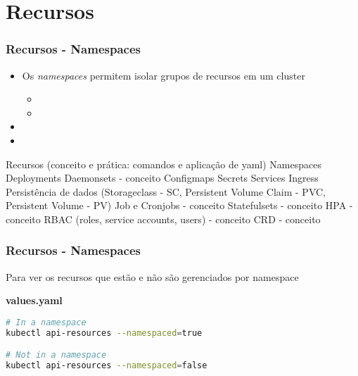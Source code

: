 \section{Recursos}

\begin{frame}
\frametitle{Recursos - Namespaces}

\begin{itemize}
	\item Os \textit{namespaces} permitem isolar grupos de recursos em um cluster
		\begin{itemize}
			\item {}
			\item {}
		\end{itemize}
	\item {}
	\item {}
\end{itemize}

Recursos (conceito e prática: comandos e aplicação de yaml)
    Namespaces
    Deployments
    Daemonsets - conceito
    Configmaps
    Secrets
    Services
    Ingress
    Persistência de dados (Storageclass - SC, Persistent Volume Claim - PVC, Persistent Volume - PV)
    Job e Cronjobs - conceito
    Statefulsets - conceito
    HPA - conceito
    RBAC (roles, service accounts, users) - conceito
    CRD - conceito

\end{frame}

\begin{frame}[containsverbatim]
\frametitle{Recursos - Namespaces}

Para ver os recursos que estão e não são gerenciados por namespace

\begin{center}
\begin{minipage}{0.9\textwidth}
\begin{block}{\textbf{values.yaml}}
\begin{lstlisting}[language=bash]
# In a namespace
kubectl api-resources --namespaced=true

# Not in a namespace
kubectl api-resources --namespaced=false
\end{lstlisting}
\end{block}
\end{minipage}
\end{center}
\end{frame}

